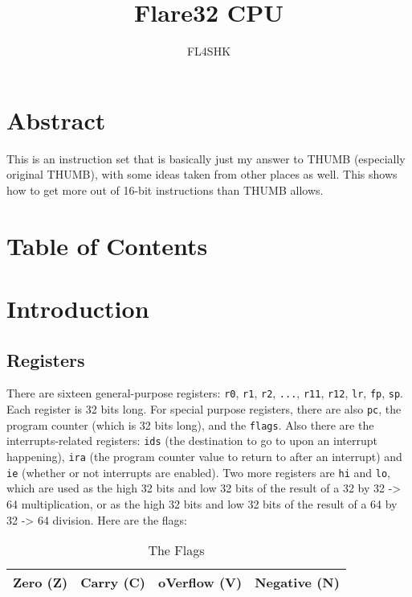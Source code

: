 \documentclass{article}
\title{Flare32 CPU}
\author{FL4SHK}
\makeatletter
\renewcommand\tableofcontents{%
    \@starttoc{toc}%
}
\makeatother
\begin{document}
	\maketitle
	\newpage


	\doublespacing
	\section{Abstract}
	\setcounter{section}{-1}
	This is an instruction set that is basically just my answer to THUMB
	(especially original THUMB), with some ideas taken from other places as
	well.  This shows how to get more out of 16-bit instructions than THUMB
	allows.

	\newpage
	\singlespacing
	\section{Table of Contents}
	\tableofcontents
	\newpage

	\doublespacing
	\section{Introduction}
	\subsection{Registers}
	There are sixteen general-purpose registers:  \texttt{r0}, \texttt{r1},
	\texttt{r2}, \texttt{...}, \texttt{r11}, \texttt{r12}, \texttt{lr},
	\texttt{fp}, \texttt{sp}.  Each register
	is 32 bits long.  For special purpose registers, there are also
	\texttt{pc}, the program counter (which is 32 bits long), and the
	\texttt{flags}.  Also there are the interrupts-related registers:
	\texttt{ids} (the destination to go to upon an interrupt happening),
	\texttt{ira} (the program counter value to return to after an
	interrupt) and \texttt{ie} (whether or not interrupts are enabled).
	Two more registers are \texttt{hi} and \texttt{lo}, which are used as
	the high 32 bits and low 32 bits of the result of a 32 by 32 -> 64
	multiplication, or as the high 32 bits and low 32 bits of the result of
	a 64 by 32 -> 64 division.  Here are the flags:

	\begin{table}[H]
		\begin{center}
			\caption{The Flags}
			\label{tab:flags}
			\begin{tabular}{|c|c|c|c|}
				\hline
				Zero (Z) & Carry (C) & oVerflow (V) & Negative (N)\\
				\hline
			\end{tabular}
		\end{center}
	\end{table}
\end{document}
